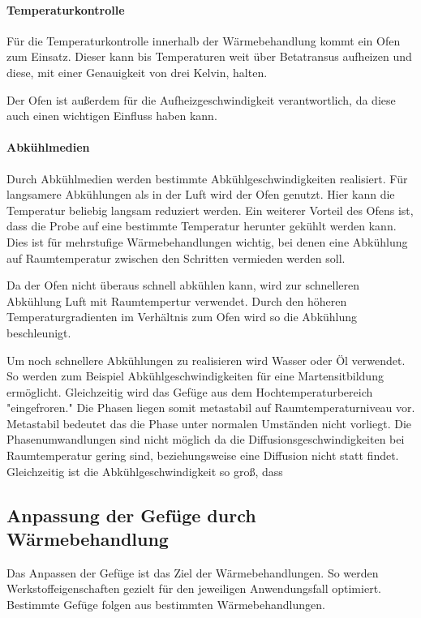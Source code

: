\documentclass[a4paper, singlepage, 11pt]{tubsreprt}
\begin{document}
\paragraph{Temperaturkontrolle}
Für die Temperaturkontrolle innerhalb der Wärmebehandlung kommt ein Ofen zum Einsatz. Dieser kann bis Temperaturen weit über Betatransus aufheizen und diese, mit einer Genauigkeit von drei Kelvin, halten. 

Der Ofen ist außerdem für die Aufheizgeschwindigkeit verantwortlich, da diese auch einen wichtigen Einfluss haben kann.
\paragraph{Abkühlmedien}

Durch Abkühlmedien werden bestimmte Abkühlgeschwindigkeiten realisiert. Für langsamere Abkühlungen als in der Luft wird der Ofen genutzt. Hier kann die Temperatur beliebig langsam reduziert werden. Ein weiterer Vorteil des Ofens ist, dass die Probe auf eine bestimmte Temperatur herunter gekühlt werden kann. Dies ist für mehrstufige Wärmebehandlungen wichtig, bei denen eine Abkühlung auf Raumtemperatur zwischen den Schritten vermieden werden soll. 

Da der Ofen nicht überaus schnell abkühlen kann, wird zur schnelleren Abkühlung Luft mit Raumtempertur verwendet. Durch den höheren Temperaturgradienten im Verhältnis zum Ofen wird so die Abkühlung beschleunigt.  

Um noch schnellere Abkühlungen zu realisieren wird Wasser oder Öl verwendet. So werden zum Beispiel Abkühlgeschwindigkeiten für eine Martensitbildung ermöglicht. Gleichzeitig wird das Gefüge aus dem Hochtemperaturbereich "eingefroren." Die Phasen liegen somit metastabil auf Raumtemperaturniveau vor. Metastabil bedeutet das die Phase unter normalen Umständen nicht vorliegt. Die Phasenumwandlungen sind nicht möglich da die Diffusionsgeschwindigkeiten bei Raumtemperatur gering sind, beziehungsweise eine Diffusion nicht statt findet. Gleichzeitig ist die Abkühlgeschwindigkeit so groß, dass 
\subsection*{Anpassung der Gefüge durch Wärmebehandlung}

Das Anpassen der Gefüge ist das Ziel der Wärmebehandlungen. So werden Werkstoffeigenschaften gezielt für den jeweiligen Anwendungsfall optimiert. Bestimmte Gefüge folgen aus bestimmten Wärmebehandlungen.


\listoffigures
\listoftables
\end{document}
